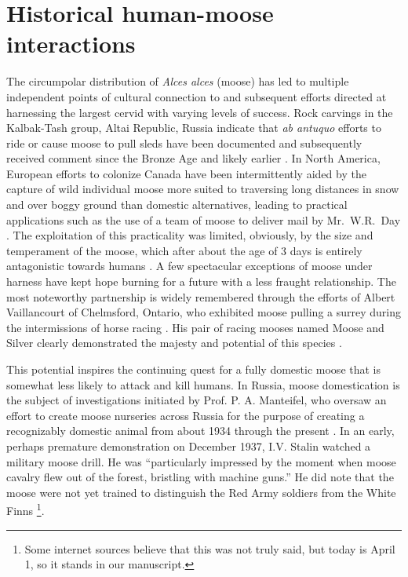 \section{Historical human-moose interactions}
\label{app:history}

The circumpolar distribution of \textit{Alces alces} (moose) has led to multiple independent points of cultural connection to and subsequent efforts directed at harnessing the largest cervid with varying levels of success.
Rock carvings in the Kalbak-Tash group, Altai Republic, Russia indicate that \textit{ab antuquo} efforts to ride or cause moose to pull sleds have been documented and subsequently received comment since the Bronze Age and likely earlier \citep{useev_2014}.
In North America, European efforts to colonize Canada have been intermittently aided by the capture of wild individual moose more suited to traversing long distances in snow and over boggy ground than domestic alternatives, leading to practical applications such as the use of a team of moose to deliver mail by Mr.\ W.R.\ Day \citep{archives_unleashed}.
The exploitation of this practicality was limited, obviously, by the size and temperament of the moose, which after about the age of 3 days is entirely antagonistic towards humans \citep{sipko_etal_2019}.
A few spectacular exceptions of moose under harness have kept hope burning for a future with a less fraught relationship.
The most noteworthy partnership is widely remembered through the efforts of Albert Vaillancourt of Chelmsford, Ontario, who exhibited moose pulling a surrey during the intermissions of horse racing \citep{chisholm_2019}.
His pair of racing mooses named Moose and Silver clearly demonstrated the majesty and potential of this species \citep{landry_1941}.
 
This potential inspires the continuing quest for a fully domestic moose that is somewhat less likely to attack and kill humans. 
In Russia, moose domestication is the subject of investigations initiated by Prof. P. A. Manteifel, who oversaw an effort to create moose nurseries across Russia for the purpose of creating a recognizably domestic animal from about 1934 through the present \citep{sipko_etal_2019}.
In an early, perhaps premature demonstration on December 1937, I.V. Stalin watched a military moose drill. 
He was “particularly impressed by the moment when moose cavalry flew out of the forest, bristling with machine guns.” He did note that the moose were not yet trained to distinguish the Red Army soldiers from the White Finns \citep{pererva_2017}\footnote{Some internet sources believe that this was not truly said, but today is April 1, so it stands in our manuscript.}.
